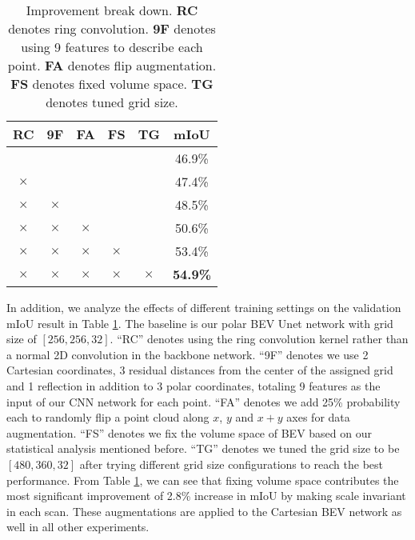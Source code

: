 \documentclass[10pt,twocolumn,letterpaper]{article}
\begin{document}
\begin{table}
\centering
\caption{Improvement break down. \textbf{RC} denotes ring convolution. \textbf{9F} denotes using 9 features to describe each point. \textbf{FA} denotes flip augmentation. \textbf{FS} denotes fixed volume space. \textbf{TG} denotes tuned grid size.}
\label{tab:ablation_study}
\begin{tabular}{ccccc|c}
\hline
\textbf{RC} & \textbf{9F} & \textbf{FA} & \textbf{FS} & \textbf{TG} & mIoU            \\

\hline
   &    &    &    &    &  46.9\%          \\
$\times$  &    &    &    &    &  47.4\%          \\
$\times$  & $\times$  &    &    &    &  48.5\%          \\
$\times$ & $\times$  & $\times$  &    &    &  50.6\%          \\
$\times$  &$\times$  & $\times$  & $\times$  &    &  53.4\%          \\
$\times$ & $\times$  & $\times$  & $\times$  & $\times$  &  \textbf{54.9\%} \\
\hline
\end{tabular}

\vspace{-4pt}
\end{table}

In addition, we analyze the effects of different training settings on the validation mIoU result in Table \ref{tab:ablation_study}. The baseline is our polar BEV Unet network with grid size of $[256,256,32]$. ``RC'' denotes using the ring convolution kernel rather than a normal 2D convolution in the backbone network. ``9F'' denotes we use 2 Cartesian coordinates, 3 residual distances from the center of the assigned grid and 1 reflection in addition to 3 polar coordinates, totaling 9 features as the input of our CNN network for each point. ``FA'' denotes we add 25\% probability each to randomly flip a point cloud along $x$, $y$ and $x+y$ axes for data augmentation. ``FS'' denotes we fix the volume space of BEV based on our statistical analysis mentioned before. ``TG'' denotes we tuned the grid size to be $[480,360,32]$ after trying different grid size configurations to reach the best performance. From Table \ref{tab:ablation_study}, we can see that fixing volume space contributes the most significant improvement of 2.8\% increase in mIoU by making scale invariant in each scan. These augmentations are applied to the Cartesian BEV network as well in all other experiments.
\end{document}
